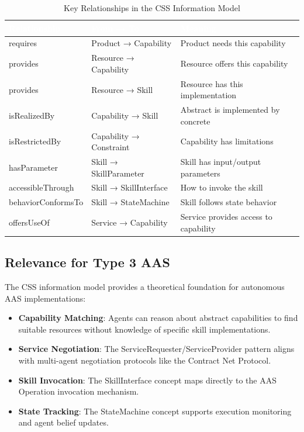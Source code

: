 \begin{table}[ht]
\centering
\caption{Key Relationships in the CSS Information Model}
\label{tab:css_relationships}
\begin{tabular}{lll}
\toprule
\rowcolor{headerblue}
\textcolor{white}{Relationship} & \textcolor{white}{From → To} & \textcolor{white}{Meaning} \\
\midrule
requires & Product → Capability & Product needs this capability \\
\rowcolor{lightgray}
provides & Resource → Capability & Resource offers this capability \\
provides & Resource → Skill & Resource has this implementation \\
\rowcolor{lightgray}
isRealizedBy & Capability → Skill & Abstract is implemented by concrete \\
isRestrictedBy & Capability → Constraint & Capability has limitations \\
\rowcolor{lightgray}
hasParameter & Skill → SkillParameter & Skill has input/output parameters \\
accessibleThrough & Skill → SkillInterface & How to invoke the skill \\
\rowcolor{lightgray}
behaviorConformsTo & Skill → StateMachine & Skill follows state behavior \\
offersUseOf & Service → Capability & Service provides access to capability \\
\bottomrule
\end{tabular}
\end{table}
\subsection{Relevance for Type 3 AAS}

The CSS information model provides a theoretical foundation for autonomous \ac{AAS} implementations:

\begin{itemize}
    \item \textbf{Capability Matching}: Agents can reason about abstract capabilities to find suitable resources without knowledge of specific skill implementations.
    
    \item \textbf{Service Negotiation}: The ServiceRequester/ServiceProvider pattern aligns with multi-agent negotiation protocols like the Contract Net Protocol.
    
    \item \textbf{Skill Invocation}: The SkillInterface concept maps directly to the \ac{AAS} Operation invocation mechanism.
    
    \item \textbf{State Tracking}: The StateMachine concept supports execution monitoring and agent belief updates.
\end{itemize}

